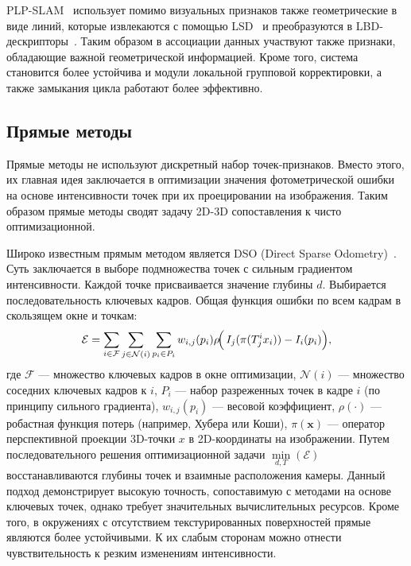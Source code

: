PLP-SLAM~\cite{shu2023structure} использует помимо визуальных признаков также геометрические в виде линий,
которые извлекаются с помощью LSD~\cite{von2012lsd} и преобразуются в LBD-дескрипторы~\cite{zhang2013efficient}. Таким образом
в ассоциации данных участвуют также признаки, обладающие важной геометрической информацией.
Кроме того, система становится более устойчива и модули локальной групповой корректировки, а также
замыкания цикла работают более эффективно.


\subsection{Прямые методы}
Прямые методы не используют дискретный набор точек-признаков. Вместо этого, их главная
идея заключается в оптимизации значения фотометрической ошибки на основе интенсивности точек при их проецировании на изображения. 
Таким образом прямые методы сводят задачу 2D-3D сопоставления к чисто оптимизационной.


Широко известным прямым методом является DSO (Direct Sparse Odometry)~\cite{engel2017direct}. Суть заключается
в выборе подмножества точек с сильным градиентом интенсивности. Каждой точке 
присваивается значение глубины $d$. Выбирается последовательность ключевых кадров.
Общая функция ошибки по всем кадрам в скользящем окне и точкам:
\begin{equation}
    \mathcal{E} = 
    \sum_{i \in \mathcal{F}} \sum_{j \in \mathcal{N}(i)} 
    \sum_{{p}_i \in P_i}
    w_{i,j}({p}_i) \rho\!\Bigl(\,
    I_j(\pi({T}_j^i {x}_i)) - I_i({p}_i)
    \Bigr),
\end{equation}
где  $\mathcal{F}$ --- множество ключевых кадров в окне оптимизации, $\mathcal{N}(i)$ ---
множество соседних ключевых кадров к $i$, $P_i$ --- набор разреженных 
точек в кадре $i$ (по принципу сильного градиента), $w_{i,j}({p}_i)$ --- 
весовой коэффициент, $\rho(\cdot)$ --- робастная функция потерь (например, 
Хубера или Коши), $\pi(\mathbf{x})$ --- оператор перспективной проекции 
3D-точки $x$ в 2D-координаты на изображении. Путем последовательного решения оптимизационной
задачи $\min\limits_{d, T}(\mathcal{E})$ восстанавливаются глубины точек и взаимные расположения 
камеры. Данный подход демонстрирует высокую точность, сопоставимую с
методами на основе ключевых точек, однако требует значительных вычислительных ресурсов.
Кроме того, в окружениях с отсутствием текстурированных поверхностей прямые являются
более устойчивыми. К их слабым сторонам можно отнести чувствительность к резким изменениям интенсивности.

